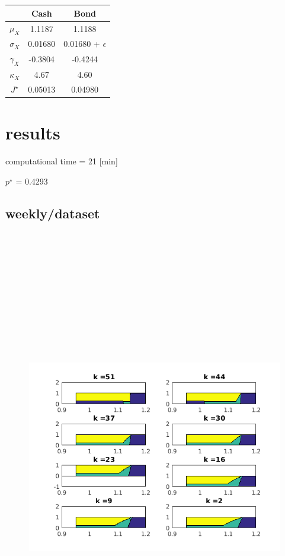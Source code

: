 \documentclass[]{article}
\begin{document}
\begin{center}
	\begin{tabular}{|c | c | c|} 
		\hline
		         & Cash & Bond \\ [0.5ex] 
		\hline\hline
		$\mu_X$ & 1.1187 & 1.1188  \\ 
		\hline
		$\sigma_X$ & 0.01680 & 0.01680 + $\epsilon$ \\
		\hline
		$\gamma_X$ & -0.3804 & -0.4244 \\
		\hline
		$\kappa_X$ & 4.67 & 4.60 \\
		\hline
		$J^{\star}$ & 0.05013 & 0.04980 \\
		\hline
	\end{tabular}
\end{center}
\section{results}
computational time = 21 [min]

$p^{\star}$ = 0.4293

\subsection{weekly/dataset}
\begin{figure}[H]
	\centering
	\includegraphics[width=18cm,height=20cm,keepaspectratio]{weekly.png}
\end{figure}
\end{document}
